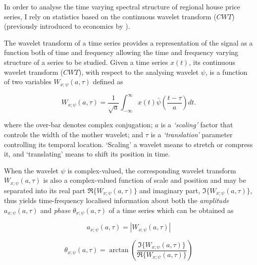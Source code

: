 \documentclass[11pt]{article}
\begin{document}
In order to analyse the time varying spectral structure of regional house price series, I rely on statistics based on the continuous wavelet transform ($CWT$) (previously introduced to economics by \cite{Aguiar-Conraria2014}).


The wavelet transform of a time series provides a representation of the signal as a function both of time and frequency allowing the time and frequency varying structure of a series to be studied. Given a time series $x(t)$, its continuous wavelet transform ($CWT$), with respect to the analysing wavelet $\psi$, is a function of two variables  $W_{x;\psi} (a,\tau)$ defined as

\begin{equation}
 W_{x;\psi}(a,\tau)=\frac{1}{\sqrt{a}}\int_{-\infty}^{\infty}x(t)\bar{\psi}\left(\frac{t-\tau}{a}\right)dt.
 \label{eq:cwt}
\end{equation}

where the over-bar denotes complex conjugation; $a$ is a \textit{‘scaling’} factor that controls the width of the mother wavelet; and $\tau$ is a \textit{‘translation’} parameter controlling its temporal location. ‘Scaling’ a wavelet means to stretch or compress it, and ‘translating’ means to shift its position in time.

When the wavelet $\psi$ is complex-valued, the corresponding wavelet transform $W_{x;\psi} (a,\tau)$ is also a complex-valued function of scale and position and may be separated into its real part $\mathfrak{R}\{W_{x;\psi} (a,\tau)\}$ and imaginary part, $\mathfrak{I}\{W_{x;\psi} (a,\tau)\}$, thus yields time-frequency localised information about both the \textit{amplitude} $a_{x;\psi}(a,\tau)$ and \textit{phase} $\theta_{x;\psi}(a,\tau)$ of a time series which can be obtained as

\begin{equation}
 a_{x;\psi}(a,\tau)=\left|W_{x;\psi}(a,\tau)\right|
 \label{eq:amp}
\end{equation}

\begin{equation}
 \theta_{x;\psi}(a,\tau)=\arctan{\left(\frac{\mathfrak{I}\{W_{x;\psi} (a,\tau)\}}{\mathfrak{R}\{W_{x;\psi} (a,\tau)\}}\right)}
 \label{eq:phase}
\end{equation}
\end{document}
